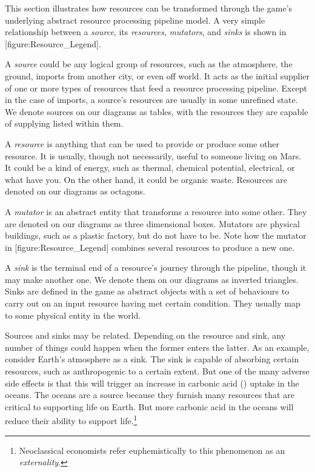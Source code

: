 
This section illustrates how resources can be transformed through the game's underlying abstract resource processing pipeline model. A very simple relationship between a {\it source}, its {\it resources}, {\it mutators}, and {\it sinks} is shown in [figure:Resource_Legend].

    {}

A {\it source} could be any logical group of resources, such as the atmosphere, the ground, imports from another city, or even off world. It acts as the initial supplier of one or more types of resources that feed a resource processing pipeline. Except in the case of imports, a source's resources are usually in some unrefined state. We denote sources on our diagrams as tables, with the resources they are capable of supplying listed within them.

A {\it resource} is anything that can be used to provide or produce some other resource. It is usually, though not necessarily, useful to someone living on Mars. It could be a kind of energy, such as thermal, chemical potential, electrical, or what have you. On the other hand, it could be organic waste. Resources are denoted on our diagrams as octagons.

A {\it mutator} is an abstract entity that transforms a resource into some other. They are denoted on our diagrams as three dimensional boxes. Mutators are physical buildings, such as a plastic factory, but do not have to be. Note how the mutator in [figure:Resource_Legend] combines several resources to produce a new one.

A {\it sink} is the terminal end of a resource's journey through the pipeline, though it may make another one. We denote them on our diagrams as inverted triangles. Sinks are defined in the game as abstract objects with a set of behaviours to carry out on an input resource having met certain condition. They usually map to some physical entity in the world. 

Sources and sinks may be related. Depending on the resource and sink, any number of things could happen when the former enters the latter. As an example, consider Earth's atmosphere as a sink. The sink is capable of absorbing certain resources, such as anthropogenic  to a certain extent. But one of the many adverse side effects is that this will trigger an increase in carbonic acid () uptake in the oceans. The oceans are a source because they furnish many resources that are critical to supporting life on Earth. But more carbonic acid in the oceans will reduce their ability to support life.\footnote{Neoclassical economists refer euphemistically to this phenomenon as an {\it externality}.} 

